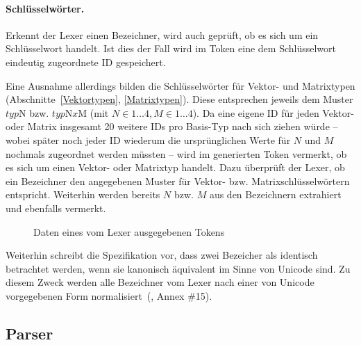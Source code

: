\documentclass[twoside,a4paper,fleqn,12pt]{article}
\begin{document}
\paragraph{Schlüsselwörter.} Erkennt der Lexer einen Bezeichner, wird auch geprüft, ob es sich um ein Schlüsselwort handelt. Ist dies der Fall
wird im Token eine dem Schlüsselwort eindeutig zugeordnete ID gespeichert.

Eine Ausnahme allerdings bilden die Schlüsselwörter für Vektor- und Matrixtypen (Abschnitte~\ref{Vektortypen}, \ref{Matrixtypen}). Diese entsprechen
jeweils dem Muster $\mathit{typ}\mathrm{N}$ bzw. $\mathit{typ}\mathrm{N}\mathit{x}\mathrm{M}$ (mit $N \in 1 \dots 4, M \in 1 \dots 4$).
Da eine eigene ID für jeden Vektor- oder Matrix insgesamt 20 weitere IDs pro Basis-Typ nach sich ziehen würde -- wobei später noch jeder ID wiederum
die ursprünglichen Werte für $N$ und $M$ nochmals zugeordnet
werden müssten -- wird im generierten Token vermerkt, ob es sich um einen Vektor- oder Matrixtyp handelt.
Dazu überprüft der Lexer, ob ein Bezeichner den angegebenen Muster für Vektor- bzw. Matrixschlüsselwörtern entspricht.
Weiterhin werden bereits $N$ bzw. $M$ aus den Bezeichnern extrahiert und ebenfalls vermerkt.

\begin{figure}[h]
   \centering
  
  \caption{Daten eines vom Lexer ausgegebenen Tokens}
  \label{fig:LexerToken}
\end{figure}



Weiterhin schreibt die Spezifikation vor, dass zwei Bezeicher als identisch betrachtet werden, wenn sie kanonisch äquivalent im Sinne von Unicode sind.
Zu diesem Zweck werden alle Bezeichner vom Lexer nach einer von Unicode vorgegebenen Form normalisiert~(\cite{unicode}, Annex \#15).

\subsection{Parser}
\end{document}
